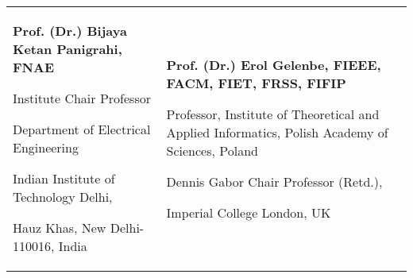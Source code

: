 

\begin{tabularx}{\textwidth}{@{}X X@{}}
\textbf{Prof. (Dr.) Bijaya Ketan Panigrahi, FNAE}\par
Institute Chair Professor\par
Department of Electrical Engineering\par
Indian Institute of Technology Delhi, \par Hauz Khas, New Delhi-110016, India\par 
\makefield{\faEnvelope[regular]}{\url{bkpanigrahi@ee.iitd.ac.in}}
& 
\textbf{Prof. (Dr.) Erol Gelenbe, FIEEE, FACM, FIET, FRSS, FIFIP}\par
Professor, Institute of Theoretical and Applied Informatics, Polish Academy of Sciences, Poland \par
Dennis Gabor Chair Professor (Retd.), \par Imperial College London, UK \par
\makefield{\faEnvelope[regular]}{\url{seg@iitis.pl}}
\end{tabularx}
